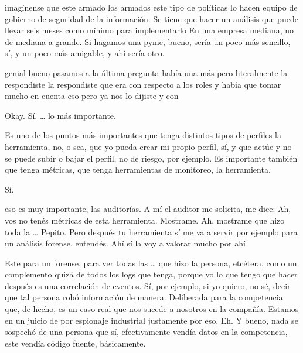 \begin{description}[leftmargin=0cm, labelsep=0.5cm]
imagínense que este armado los armados este tipo de políticas lo hacen equipo de gobierno de seguridad de la información. Se tiene que hacer un análisis que puede llevar seis meses como mínimo para implementarlo En una empresa mediana, no de mediana a grande. Si hagamos una pyme, bueno, sería un poco más sencillo, sí, y un poco más amigable, y ahí sería otro.

    \item[\textbf{MOCIULSKY SANTIAGO:}] genial bueno pasamos a la última pregunta había una más pero literalmente la respondiste la respondiste que era con respecto a los roles y había que tomar mucho en cuenta eso pero ya nos lo dijiste y con

    \item[\textbf{PEÑA ALEJANDRO FRANCISCO:}] Okay. Sí. … lo más importante.

    \item[\textbf{PEÑA ALEJANDRO FRANCISCO:}] Es uno de los puntos más importantes que tenga distintos tipos de perfiles la herramienta, no, o sea, que yo pueda crear mi propio perfil, sí, y que actúe y no se puede subir o bajar el perfil, no de riesgo, por ejemplo. Es importante también que tenga métricas, que tenga herramientas de monitoreo, la herramienta.

    \item[\textbf{MOCIULSKY SANTIAGO:}] Sí.

    \item[\textbf{PEÑA ALEJANDRO FRANCISCO:}] eso es muy importante, las auditorías. A mí el auditor me solicita, me dice: Ah, vos no tenés métricas de esta herramienta. Mostrame. Ah, mostrame que hizo toda la … Pepito. Pero después tu herramienta sí me va a servir por ejemplo para un análisis forense, entendés. Ahí sí la voy a valorar mucho por ahí

    \item[\textbf{PEÑA ALEJANDRO FRANCISCO:}] Este para un forense, para ver todas las … que hizo la persona, etcétera, como un complemento quizá de todos los logs que tenga, porque yo lo que tengo que hacer después es una correlación de eventos. Sí, por ejemplo, si yo quiero, no sé, decir que tal persona robó información de manera. Deliberada para la competencia que, de hecho, es un caso real que nos sucede a nosotros en la compañía. Estamos en un juicio de por espionaje industrial justamente por eso. Eh. Y bueno, nada se sospechó de una persona que sí, efectivamente vendía datos en la competencia, este vendía código fuente, básicamente.


\end{description}
